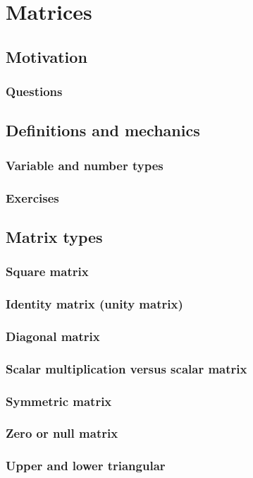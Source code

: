 \chapter{Matrices}
\section{Motivation}
\subsection{Questions}
\section{Definitions and mechanics}
\subsection{Variable and number types}
\subsection{Exercises}
\section{Matrix types}
\subsection{Square matrix}
\subsection{Identity matrix (unity matrix)}
\subsection{Diagonal matrix}
\subsection{Scalar multiplication versus scalar matrix}
\subsection{Symmetric matrix}
\subsection{Zero or null matrix}
\subsection{Upper and lower triangular}
